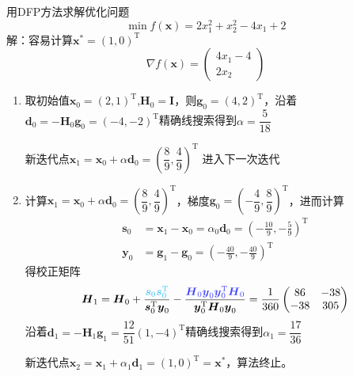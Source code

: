 \begin{example}
    用DFP方法求解优化问题
    \[
        \min f(\boldsymbol{x})=2x_{1}^{2}+x_{2}^{2}-4x_{1}+2
    \]
    解：容易计算$\boldsymbol{x}^* = (1,0)^{\mathrm{T}}$
    \[
        \nabla f(\boldsymbol{x}) = \begin{pmatrix}
            4x_1-4\\
            2x_2
        \end{pmatrix}
    \]
    \begin{enumerate}
        \item 取初始值$\boldsymbol{x}_0 = (2,1)^{\mathrm{T}}$,$\boldsymbol{H}_0 = \boldsymbol{I}$，则$\boldsymbol{g}_0 = (4,2)^{\mathrm{T}}$，沿着$\boldsymbol{d}_0 = -\boldsymbol{H}_0\boldsymbol{g}_0 = (-4,-2)^{\mathrm{T}}$精确线搜索得到$\alpha = \dfrac{5}{18}$
        
        新迭代点$\boldsymbol{x}_1 = \boldsymbol{x}_0+\alpha\boldsymbol{d}_0 = (\dfrac{8}{9},\dfrac{4}{9})^{\mathrm{T}}$
        进入下一次迭代
        \item 计算$\boldsymbol{x}_1 = \boldsymbol{x}_0+\alpha\boldsymbol{d}_0 = (\dfrac{8}{9},\dfrac{4}{9})^{\mathrm{T}}$，梯度$\boldsymbol{g}_0 = (-\dfrac{4}{9},\dfrac{8}{9})^{\mathrm{T}}$，进而计算
        \[
            \begin{aligned}
                \boldsymbol{s}_0&= \boldsymbol{x}_{1}-\boldsymbol{x}_{0} =\alpha_0\boldsymbol{d}_0=(-\frac{10}{9},-\frac{5}{9})^{\mathrm{T}}\\ 
                \boldsymbol{y}_0&=\boldsymbol{g}_1-\boldsymbol{g}_0=(-\frac{40}{9},-\frac{40}{9})^{\mathrm{T}}
            \end{aligned}
        \]
        得校正矩阵
        \[
            \boldsymbol{H}_1=\boldsymbol{H}_{0} + \dfrac{\textcolor{cyan!75}{\boldsymbol{s}_{0}\boldsymbol{s}_{0}^{\mathrm{T}}}}{\boldsymbol{s}_{0}^{\mathrm{T}}\boldsymbol{y}_{0}} - \dfrac{\textcolor{blue!75}{\boldsymbol{H}_{0}\boldsymbol{y}_{0}\boldsymbol{y}_{0}^{\mathrm{T}}\boldsymbol{H}_{0}}}{\boldsymbol{y}_{0}^{\mathrm{T}}\boldsymbol{H}_{0}\boldsymbol{y}_{0}}
            =\frac{1}{360}\begin{pmatrix}86&-38\\-38&305\end{pmatrix}
        \]
        沿着$\boldsymbol{d}_1=-\boldsymbol{H}_1\boldsymbol{g}_1=\dfrac{12}{51}(1,-4)^{\mathrm{T}}$精确线搜索得到$\alpha_1 = \dfrac{17}{36}$
        
        新迭代点$\boldsymbol{x}_{2}=\boldsymbol{x}_{1}+\alpha_{1}\boldsymbol{d}_{1}=\left(1,0\right)^{\mathrm{T}}=\boldsymbol{x}^{*}$，算法终止。
    \end{enumerate}
\end{example}

